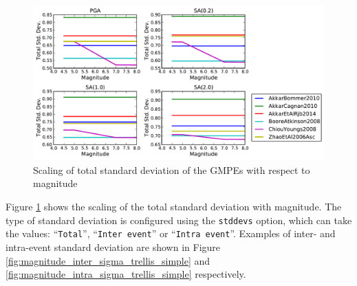\begin{figure}[htb]
	\centering
		\includegraphics[width=\textwidth]{./figures/trellis/magnitude_total_sigma_imt_trellis_simple.pdf}
	\caption{Scaling of total standard deviation of the GMPEs with respect to magnitude}
	\label{fig:magnitude_total_sigma_trellis_simple}
\end{figure}

Figure \ref{fig:magnitude_total_sigma_trellis_simple} shows the scaling of the total standard deviation with magnitude. The type of standard deviation is configured using the \verb=stddevs= option, which can take the values: ``\verb=Total='', ``\verb=Inter event='' or ``\verb=Intra event=''. Examples of inter- and intra-event standard deviation are shown in Figure \ref{fig:magnitude_inter_sigma_trellis_simple} and \ref{fig:magnitude_intra_sigma_trellis_simple} respectively.

